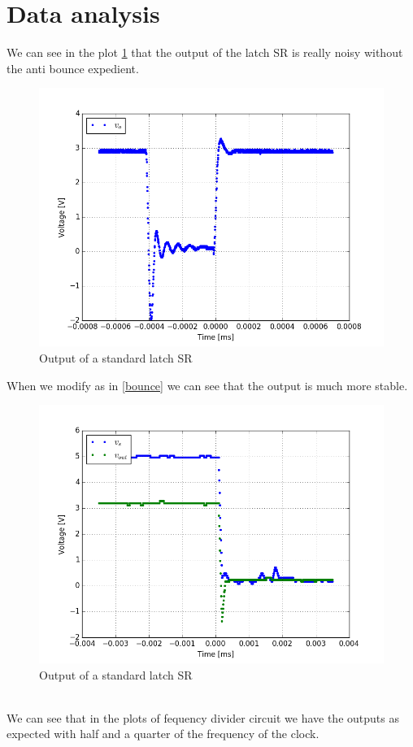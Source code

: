 \section{Data analysis}
We can see in the plot \ref{bounce_time} that the output of the latch SR is really noisy without the anti bounce expedient.
\begin{figure}[H]
\centering
\includegraphics[width=.7\textwidth]{11/bounce_time.png}
\caption{Output of a standard latch SR}\label{bounce_time}
\end{figure}
When we modify as in \ref{bounce} we can see that the output is much more stable.
\begin{figure}[H]
\centering
\includegraphics[width=.7\textwidth]{11/anti_bounce_time3.png}
\caption{Output of a standard latch SR}\label{anti_bounce_time3}
\end{figure}\\
We can see that in the plots of fequency divider circuit we have the outputs as expected with half and a quarter of the frequency of the clock.


